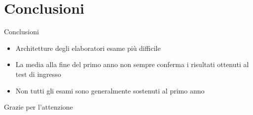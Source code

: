 \documentclass{beamer}
\begin{document}
\section{Conclusioni}

\begin{frame}{Conclusioni} 
    \begin{itemize}
      \item Architetture degli elaboratori esame più difficile
      \item La media alla fine del primo anno non sempre conferma i risultati ottenuti al test di ingresso
      \item Non tutti gli esami sono generalmente sostenuti al primo anno
    \end{itemize} 
\end{frame}

\begin{frame}
  \begin{center}
  \Huge Grazie per l'attenzione
  \end{center}
\end{frame}
\end{document}
